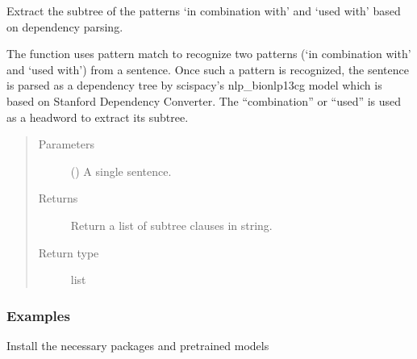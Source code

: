 \documentclass[letterpaper,10pt,english]{sphinxmanual}
\begin{document}
\begin{fulllineitems}
\label{\detokenize{biomarker_extraction:biomarker_extraction.sent_subtree}}
\sphinxAtStartPar
Extract the subtree of the patterns ‘in combination with’ and ‘used with’ based on dependency parsing.

\sphinxAtStartPar
The function uses pattern match to recognize two patterns (‘in combination with’ and ‘used with’) from a sentence. Once such a pattern is recognized, the sentence is parsed as a dependency tree by scispacy’s nlp\_bionlp13cg model which is based on Stanford Dependency Converter. The “combination” or “used” is used as a headword to extract its subtree.
\begin{quote}\begin{description}
\item[{Parameters}] \leavevmode
\sphinxAtStartPar
{} () \textendash{} A single sentence.

\item[{Returns}] \leavevmode
\sphinxAtStartPar
Return a list of subtree clauses in string.

\item[{Return type}] \leavevmode
\sphinxAtStartPar
list

\end{description}\end{quote}
\subsubsection*{Examples}

\sphinxAtStartPar
Install the necessary packages and pre\sphinxhyphen{}trained models

\begin{sphinxVerbatim}[commandchars=\\\{\}]
\end{sphinxVerbatim}


\end{fulllineitems}
\end{document}
